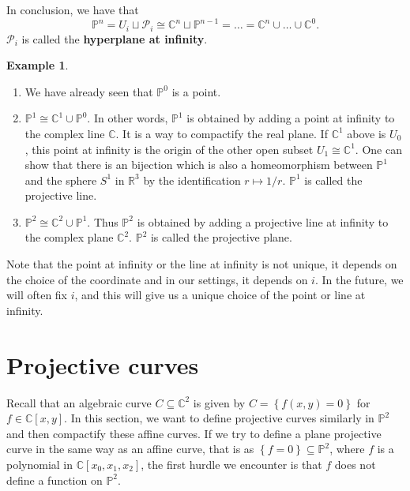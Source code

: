 \documentclass{article}
\newcommand{\R}{\mathbb{R}}
\newcommand{\C}{\mathbb{C}}
\renewcommand{\P}{\mathbb{P}}
\newcommand{\rb}[1]{\left( #1 \right)}
\renewcommand{\sb}[1]{\left[ #1 \right]}
\newcommand{\cb}[1]{\left\{ #1 \right\}}
\theoremstyle{definition}\newtheorem{definition}{Definition}[section]
\theoremstyle{definition}\newtheorem{notation}[definition]{Notation}
\theoremstyle{definition}\newtheorem{remark}[definition]{Remark}
\theoremstyle{definition}\newtheorem{example}[definition]{Example}
\theoremstyle{definition}\newtheorem{fact}{Fact}
\theoremstyle{definition}\newtheorem{exercise}{Exercise}
\begin{document}
In conclusion, we have that
$$ \P^n = U_i \sqcup \mathcal{P}_i \cong \C^n \sqcup \P^{n - 1} = \dots = \C^n \cup \dots \cup \C^0. $$
$ \mathcal{P}_i $ is called the \textbf{hyperplane at infinity}.

\begin{example}
\hfill
\begin{enumerate}
\item We have already seen that $ \P^0 $ is a point.
\item $ \P^1 \cong \C^1 \cup \P^0 $. In other words, $ \P^1 $ is obtained by adding a point at infinity to the complex line $ \C $. It is a way to compactify the real plane. If $ \C^1 $ above is $ U_0 $, this point at infinity is the origin of the other open subset $ U_1 \cong \C^1 $. One can show that there is an bijection which is also a homeomorphism between $ \P^1 $ and the sphere $ S^1 $ in $ \R^3 $ by the identification $ r \mapsto 1 / r $. $ \P^1 $ is called the projective line.
\item $ \P^2 \cong \C^2 \cup \P^1 $. Thus $ \P^2 $ is obtained by adding a projective line at infinity to the complex plane $ \C^2 $. $ \P^2 $ is called the projective plane.
\end{enumerate}
\end{example}

Note that the point at infinity or the line at infinity is not unique, it depends on the choice of the coordinate and in our settings, it depends on $ i $. In the future, we will often fix $ i $, and this will give us a unique choice of the point or line at infinity.


\section{Projective curves}

Recall that an algebraic curve $ C \subseteq \C^2 $ is given by $ C = \cb{f\rb{x, y} = 0} $ for $ f \in \C\sb{x, y} $. In this section, we want to define projective curves similarly in $ \P^2 $ and then compactify these affine curves. If we try to define a plane projective curve in the same way as an affine curve, that is as $ \cb{f = 0} \subseteq \P^2 $, where $ f $ is a polynomial in $ \C\sb{x_0, x_1, x_2} $, the first hurdle we encounter is that $ f $ does not define a function on $ \P^2 $.
\end{document}
